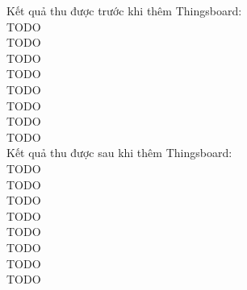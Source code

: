 Kết quả thu được trước khi thêm Thingsboard: \\


TODO\\
TODO \\
TODO\\
TODO\\
TODO\\
TODO\\
TODO\\
TODO\\



Kết quả thu được sau khi thêm Thingsboard:\\


TODO\\
TODO \\
TODO\\
TODO\\
TODO\\
TODO\\
TODO\\
TODO\\

